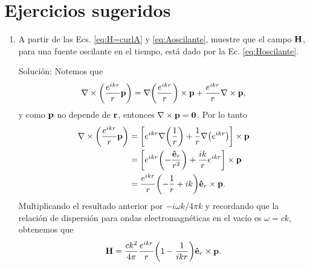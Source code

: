 
\section{Ejercicios sugeridos}

\begin{enumerate}[label=\textbf{Ejercicio \thechapter.\arabic*},resume]
\item A partir de las Ecs. \eqref{eq:H=curlA} y \eqref{eq:Aoscilante}, muestre que el campo $\vb{H}$, para una fuente oscilante en el tiempo, está dado por la Ec. \eqref{eq:Hoscilante}.
\label{ex:Hoscilante}
\item[\color{blue} Solución:]
	Notemos que
	\begin{align*}
	\nabla\times\qty(\frac{e^{ikr}}{r}\vb{p}) = \nabla\qty(\frac{e^{ikr}}{r})\times\vb{p} + \frac{e^{ikr}}{r}\nabla\times\vb{p},
\end{align*}		
y como $\vb{p}$ no depende de $\vb{r}$, entonces $\nabla\times\vb{p} = \vb{0}$. Por lo tanto
\begin{align*}
\nabla\times\qty(\frac{e^{ikr}}{r}\vb{p}) 
	 &= \qty[e^{ikr}\nabla\qty(\frac{1}{r})+\frac{1}{r}\nabla\qty(e^{ikr})]\times\vb{p}\\
	 &= \qty[e^{ikr}\qty(-\frac{\vu{e}_r}{r^2})+\frac{ik}{r}e^{ikr}] \times\vb{p}\\
	 &= \frac{e^{ikr}}{r}\qty(-\frac{1}{r}+ik)\vu{e}_r\times\vb{p}.
\end{align*}
Multiplicando el resultado anterior por $-i\omega k/4\pi k$ y recordando que la relación de dispersión para ondas electromagnéticas en el vacío es $\omega =  ck$,  obtenemos que
	\begin{align*}
	\vb{H} = \frac{ck^2}{4\pi}\frac{e^{ikr}}{r}\qty(1-\frac{1}{ikr})\vu{e}_r\times\vb{p}.
	\end{align*}
	

\end{enumerate}
